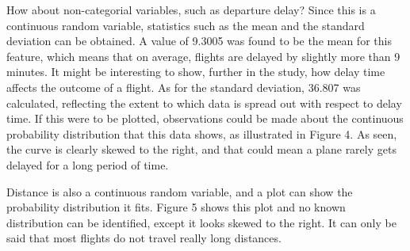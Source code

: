 \documentclass{article}
\begin{document}
    How about non-categorial variables, such as departure delay? Since this is a continuous random variable, statistics such as the mean and the standard deviation
    can be obtained. A value of 9.3005 was found to be the mean for this feature, which means that on average, flights are delayed
    by slightly more than 9 minutes. It might be interesting to show, further in the study, how delay time affects the outcome of
    a flight. As for the standard deviation, 36.807 was calculated, reflecting the extent to which data is spread out with respect
    to delay time. If this were to be plotted, observations could be made about the continuous probability distribution that this data shows, as illustrated in Figure 4. As seen, the curve is clearly skewed to the right, and that could mean a plane rarely gets
    delayed for a long period of time.

    Distance is also a continuous random variable, and a plot can show the probability distribution it fits. Figure 5 shows this plot
    and no known distribution can be identified, except it looks skewed to the right. It can only be said that most flights do not
    travel really long distances.
\end{document}
